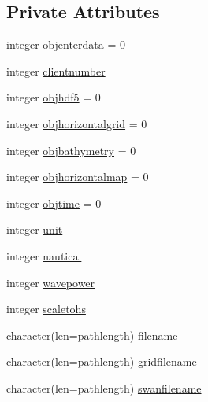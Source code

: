 \subsection*{Private Attributes}
\begin{DoxyCompactItemize}
\item 
integer \mbox{\hyperlink{structmodulereadswannonstationary_1_1t__swan_ad2dbadc5ab3cf4fee024197c36c9bd7a}{objenterdata}} = 0
\item 
integer \mbox{\hyperlink{structmodulereadswannonstationary_1_1t__swan_ad18d613004824fd9e8e61fb25eaba7cb}{clientnumber}}
\item 
integer \mbox{\hyperlink{structmodulereadswannonstationary_1_1t__swan_a367b06c6c33321c027cfa976ad724775}{objhdf5}} = 0
\item 
integer \mbox{\hyperlink{structmodulereadswannonstationary_1_1t__swan_ab6519eace13034f06f1686ea47efbd99}{objhorizontalgrid}} = 0
\item 
integer \mbox{\hyperlink{structmodulereadswannonstationary_1_1t__swan_a767ba1dbbfd79e9c92552e8146efd239}{objbathymetry}} = 0
\item 
integer \mbox{\hyperlink{structmodulereadswannonstationary_1_1t__swan_ad6a4cba8e19947228651dc85946c9893}{objhorizontalmap}} = 0
\item 
integer \mbox{\hyperlink{structmodulereadswannonstationary_1_1t__swan_acd98ec3e4105f39c01065adc22017e1e}{objtime}} = 0
\item 
integer \mbox{\hyperlink{structmodulereadswannonstationary_1_1t__swan_af9a36dc035f5d7a28083424fdbe63d4c}{unit}}
\item 
integer \mbox{\hyperlink{structmodulereadswannonstationary_1_1t__swan_acf56f69875defe0de10817f18c86f561}{nautical}}
\item 
integer \mbox{\hyperlink{structmodulereadswannonstationary_1_1t__swan_a5618ce023811dcc2cc7c2a93c1836a91}{wavepower}}
\item 
integer \mbox{\hyperlink{structmodulereadswannonstationary_1_1t__swan_a2ad27bf22d9d4d4209376a94b50a2e27}{scaletohs}}
\item 
character(len=pathlength) \mbox{\hyperlink{structmodulereadswannonstationary_1_1t__swan_a06e34579adad9283cb345ca4d9f9eab0}{filename}}
\item 
character(len=pathlength) \mbox{\hyperlink{structmodulereadswannonstationary_1_1t__swan_a2400643407d7b97f7a2e1f80bc380884}{gridfilename}}
\item 
character(len=pathlength) \mbox{\hyperlink{structmodulereadswannonstationary_1_1t__swan_ae0f2f50b3b6799bc6aad25fa97e64737}{swanfilename}}

\end{DoxyCompactItemize}
